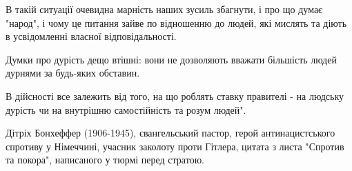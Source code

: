 В такій ситуації очевидна марність наших зусиль збагнути, і про що думає
"народ", і чому це питання зайве по відношенню до людей, які мислять та діють в
усвідомленні власної відповідальності.  

Думки про дурість дещо втішні: вони не дозволяють вважати більшість людей дурнями за будь-яких обставин. 

В дійсності все залежить від того, на що роблять ставку правителі - на людську
дурість чи на внутрішню самостійність та розум людей".

Дітріх Бонхеффер (1906-1945), євангельський пастор, герой антинацистського
спротиву у Німеччині, учасник заколоту проти Гітлера, цитата з листа "Спротив
та покора", написаного у тюрмі перед стратою.
